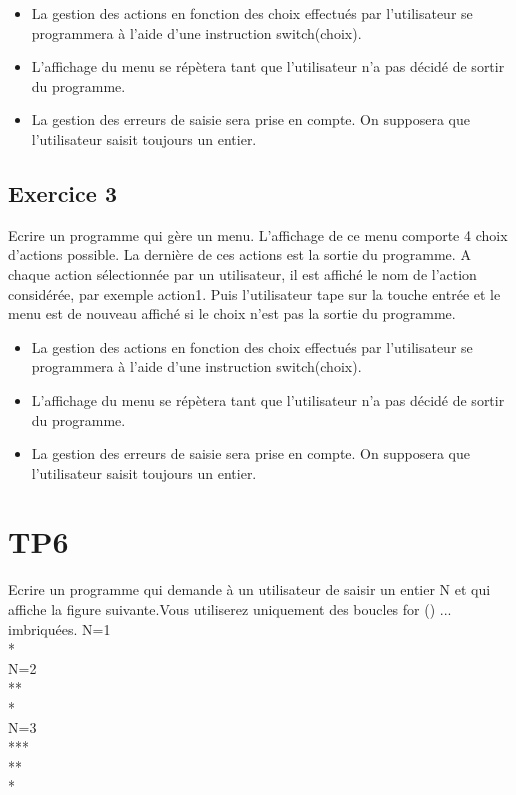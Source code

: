 \documentclass{article}
\begin{document}
			\begin{itemize}
				\item La gestion des actions en fonction des choix effectués par l'utilisateur se programmera à l'aide d'une instruction switch(choix).
				\item L'affichage du menu se répètera tant que l'utilisateur n'a pas décidé de sortir du programme.
				\item La gestion des erreurs de saisie sera prise en compte. On supposera que l'utilisateur saisit toujours un entier.	
			\end{itemize}
			
		\subsection{Exercice 3}
			Ecrire un programme qui gère un menu. L'affichage de ce menu comporte 4 choix d'actions possible. La dernière de ces actions est la sortie du programme. A chaque action sélectionnée par un utilisateur, 
			il est affiché le nom de l'action considérée, par exemple action1. Puis l'utilisateur tape sur la touche entrée et le menu est de nouveau affiché si le choix n'est pas la sortie du programme.

			\begin{itemize}
				\item La gestion des actions en fonction des choix effectués par l'utilisateur se programmera à l'aide d'une instruction switch(choix).
				\item L'affichage du menu se répètera tant que l'utilisateur n'a pas décidé de sortir du programme.
				\item La gestion des erreurs de saisie sera prise en compte. On supposera que l'utilisateur saisit toujours un entier.	
			\end{itemize}				
								
	\section{TP6}
	 Ecrire un programme qui demande à un utilisateur de saisir un entier N et qui affiche la figure suivante.Vous utiliserez uniquement des boucles for () {...} imbriquées.
	N=1\\
	*\\
	N=2\\
	**\\
	*\\
	N=3\\
	***\\
	**\\
	*\\		
			
\end{document}
